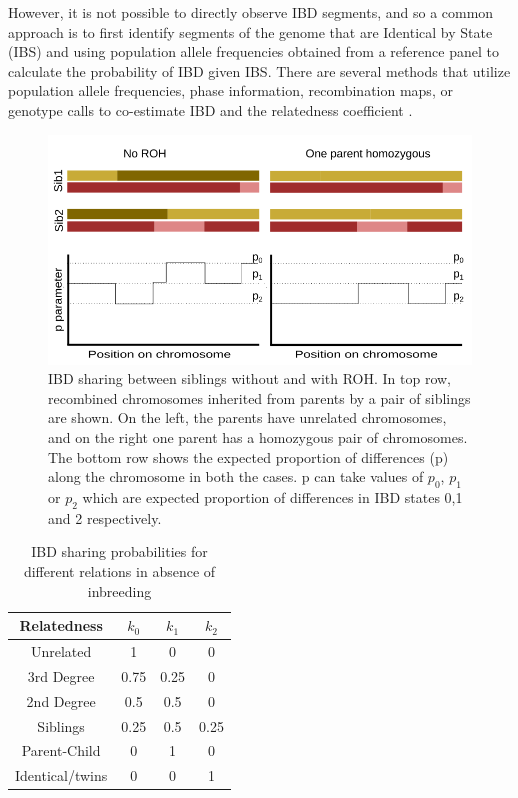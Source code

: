 \documentclass[12pt, letterpaper]{article}
\begin{document}
However, it is not possible to directly observe IBD segments, and so a common approach is to first identify segments of the genome that are Identical by State (IBS) and using population allele frequencies obtained from a reference panel to calculate the probability of IBD given IBS. There are several methods that utilize population allele frequencies, phase information, recombination maps, or genotype calls to co-estimate IBD and the relatedness coefficient \cite{huff_maximum-likelihood_2011,li_relationship_2014,li_accurate_2014,thornton_estimating_2012, boehnke_accurate_1997,lynch_estimation_1999, albrechtsen_natural_2010, purcell_plink_2007,manichaikul_robust_2010}.

\begin{figure}[h!]
    \includegraphics[width=18cm]{plots/inkscape_finalImg/schematic_sib.png}
    \centering
    \caption{IBD sharing between siblings without and with ROH. In top row, recombined chromosomes inherited from parents by a pair of siblings are shown. On the left, the parents have unrelated chromosomes, and on the right one parent has a homozygous pair of chromosomes. The bottom row shows the expected proportion of differences (p) along the chromosome in both the cases. p can take values of $p_0$, $p_1$ or $p_2$ which are expected proportion of differences in IBD states 0,1 and 2 respectively.  }
    \label{fig0:schematic}
\end{figure}


\begin{table}
\caption{\label{tab:Table 1}IBD sharing probabilities for different relations in absence of inbreeding}
\begin{tabular}{|c|c|c|c|}
    \hline
    Relatedness & $k_0$ & $k_1$ & $k_2$\\
    \hline
    Unrelated & 1 & 0 & 0\\
    \hline
    3rd Degree & 0.75 & 0.25 & 0\\
    \hline
    2nd Degree & 0.5 & 0.5 & 0\\
    \hline
    Siblings & 0.25 & 0.5 & 0.25\\
    \hline
    Parent-Child & 0 & 1 & 0\\
    \hline
    Identical/twins & 0 & 0 & 1\\
    \hline
\end{tabular}
\label{table1}
\end{table}
\end{document}
